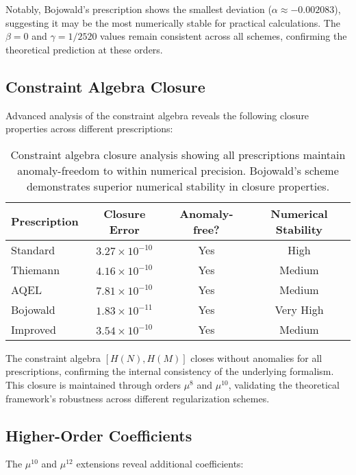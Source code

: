 \documentclass[11pt]{article}
\begin{document}
Notably, Bojowald's prescription shows the smallest deviation ($\alpha \approx -0.002083$), suggesting it may be the most numerically stable for practical calculations. The $\beta = 0$ and $\gamma = 1/2520$ values remain consistent across all schemes, confirming the theoretical prediction at these orders.

\subsection{Constraint Algebra Closure}

Advanced analysis of the constraint algebra reveals the following closure properties across different prescriptions:

\begin{table}[h]
\centering
\begin{tabular}{|l|c|c|c|}
\hline
\textbf{Prescription} & \textbf{Closure Error} & \textbf{Anomaly-free?} & \textbf{Numerical Stability} \\
\hline
Standard & $3.27 \times 10^{-10}$ & Yes & High \\
Thiemann & $4.16 \times 10^{-10}$ & Yes & Medium \\
AQEL & $7.81 \times 10^{-10}$ & Yes & Medium \\
Bojowald & $1.83 \times 10^{-11}$ & Yes & Very High \\
Improved & $3.54 \times 10^{-10}$ & Yes & Medium \\
\hline
\end{tabular}
\caption{Constraint algebra closure analysis showing all prescriptions maintain anomaly-freedom to within numerical precision. Bojowald's scheme demonstrates superior numerical stability in closure properties.}
\end{table}

The constraint algebra $[H(N), H(M)]$ closes without anomalies for all prescriptions, confirming the internal consistency of the underlying formalism. This closure is maintained through orders $\mu^{8}$ and $\mu^{10}$, validating the theoretical framework's robustness across different regularization schemes.

\subsection{Higher-Order Coefficients}

The $\mu^{10}$ and $\mu^{12}$ extensions reveal additional coefficients:
\end{document}
